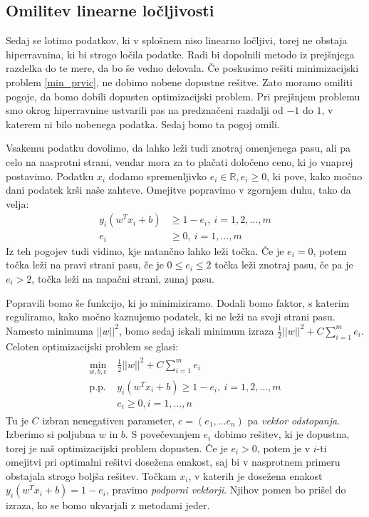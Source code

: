 \documentclass[mat1]{fmfdelo}
\newcommand{\R}{\mathbb R}
\begin{document}
\subsection{Omilitev linearne ločljivosti}\label{ssec:SplosniPodatki}
Sedaj se lotimo podatkov, ki v splošnem niso linearno ločljivi, torej ne obstaja hiperravnina, ki bi strogo ločila podatke. Radi bi dopolnili metodo iz prejšnjega razdelka do te mere, da bo še vedno delovala. Če poskusimo rešiti  minimizacijski problem \eqref{min_prvic}, ne dobimo nobene dopustne rešitve. Zato moramo omiliti pogoje, da bomo dobili dopusten optimizacijski problem. Pri prejšnjem problemu smo okrog hiperravnine ustvarili pas na predznačeni razdalji od $-1$ do $1$, v katerem ni bilo nobenega podatka. Sedaj bomo ta pogoj omili. 

Vsakemu podatku dovolimo, da lahko leži tudi znotraj omenjenega pasu, ali pa celo na nasprotni strani, vendar mora za to plačati določeno ceno, ki jo vnaprej postavimo. Podatku $x_i$ dodamo spremenljivko $e_i \in \R, e_i \ge 0$, ki pove, kako močno dani podatek krši naše zahteve. Omejitve popravimo v zgornjem duhu, tako da velja: 
\begin{align}
\label{PodV}y_i(w^Tx_i + b) &\ge 1 - e_i,  ~ i= 1, 2, \ldots, m \\
\nonumber e_i &\ge 0 , ~i = 1, \ldots, m
\end{align}
Iz teh pogojev tudi vidimo, kje natančno lahko leži točka. Če je $e_i = 0$, potem točka leži na pravi strani pasu, če je $0 \le e_i \le 2$ točka leži znotraj pasu, če pa je $e_i  > 2$, točka leži na napačni strani, zunaj pasu. 


Popravili bomo še funkcijo, ki jo minimiziramo. Dodali bomo faktor, s katerim reguliramo, kako močno kaznujemo podatek, ki ne leži na svoji strani pasu. Namesto minimuma $||w||^2$, bomo sedaj iskali minimum izraza $\frac{1}{2}||w||^2 + C\sum_{i = 1}^{m}e_i$. Celoten optimizacijski problem se glasi: 
\begin{align}
\label{NPP}
\begin{split}
\min_{w, b, e}~&\frac{1}{2}||w||^2 + C\sum_{i = 1}^{m}e_i \\
\text{p.p.} ~ &y_i(w^Tx_i + b)\ge 1 - e_i, ~i= 1, 2, \ldots, m\\
&e_i \ge 0, i = 1, \ldots, n
\end{split}
\end{align}
Tu je $C$ izbran nenegativen parameter, $e = (e_1, \ldots e_n)$ pa \emph{vektor odstopanja}. Izberimo si poljubna $w$ in $b$. S povečevanjem $e_i$ dobimo rešitev, ki je dopustna, torej je naš optimizacijski problem dopusten. Če je $e_i > 0$, potem je v $i$-ti omejitvi pri optimalni rešitvi dosežena enakost, saj bi v nasprotnem primeru obstajala strogo boljša rešitev. Točkam $x_i$, v katerih je dosežena enakost $y_i(w^Tx_i + b) = 1 - e_i$, pravimo \emph{podporni vektorji}. Njihov pomen bo prišel do izraza, ko se bomo ukvarjali z metodami jeder. 
\end{document}
